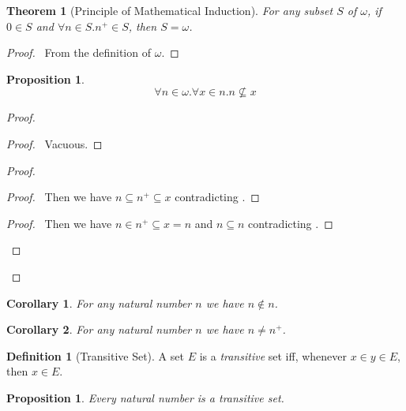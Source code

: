 \documentclass{report}
\let\qed\relax
\newtheorem{prop}[ax]{Proposition}
\newtheorem{cor}{Corollary}[ax]
\newtheorem{thm}[ax]{Theorem}
\theoremstyle{definition}
\newtheorem{df}[ax]{Definition}
\begin{document}
\begin{thm}[Principle of Mathematical Induction]
For any subset $S$ of $\omega$, if $0 \in S$ and $\forall n \in S. n^+ \in S$, then $S = \omega$.
\end{thm}

\begin{proof}
\pf\ From the definition of $\omega$. \qed
\end{proof}

\begin{prop}
\label{prop:natural_number_not_subset}
\[ \forall n \in \omega. \forall x \in n. n \not\subseteq x \]
\end{prop}

\begin{proof}
\pf
{}
\begin{proof}
	\pf\ Vacuous.
\end{proof}
\begin{proof}
	\begin{proof}
		\pf\ Then we have $n \subseteq n^+ \subseteq x$ contradicting .
	\end{proof}
	\begin{proof}
		\pf\ Then we have $n \in n^+ \subseteq x = n$ and $n \subseteq n$ contradicting .
	\end{proof}
\end{proof}
\qed
\end{proof}

\begin{cor}
\label{cor:n_notin_n}
For any natural number $n$ we have $n \notin n$.
\end{cor}

\begin{cor}
For any natural number $n$ we have $n \neq n^+$.
\end{cor}

\begin{df}[Transitive Set]
A set $E$ is a \emph{transitive} set iff, whenever $x \in y \in E$, then $x \in E$.
\end{df}

\begin{prop}
\label{prop:natural_number_transitive}
Every natural number is a transitive set.
\end{prop}
\end{document}
